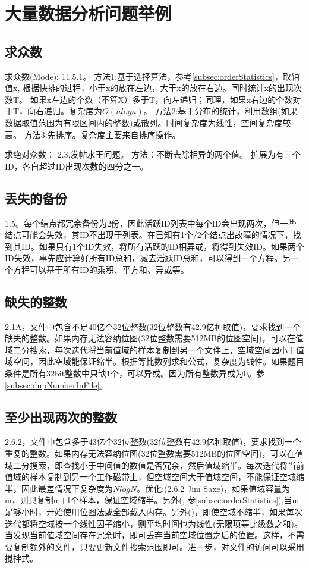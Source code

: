 
\section{大量数据分析问题举例}


\subsection{求众数}
求众数(Mode):
\cite{pp}11.5.1。
方法1:基于选择算法，参考\ref{subsec:orderStatistics}，取轴值x, 根据快排的过程，小于x的放在左边，大于x的放在右边。同时统计x的出现次数T。 如果x左边的个数（不算X）多于T，向左递归；同理，如果x右边的个数对于T，向右递归。复杂度为$O(nlogn)$。
方法2:基于分布的统计，利用数组(如果数据取值范围为有限区间内的整数)或散列。时间复杂度为线性，空间复杂度较高。
方法3:先排序。复杂度主要来自排序操作。

求绝对众数：
\cite{bop}2.3,发帖水王问题。
方法：不断去除相异的两个值。
扩展为有三个ID，各自超过ID出现次数的四分之一。



\subsection{丢失的备份}
\cite{bop}1.5。每个结点都冗余备份为2份，因此活跃ID列表中每个ID会出现两次，但一些结点可能会失效，其ID不出现于列表。在已知有1个/2个结点出故障的情况下，找到其ID。如果只有1个ID失效，将所有活跃的ID相异或，将得到失效ID。如果两个ID失效，事先应计算好所有ID总和，减去活跃ID总和，可以得到一个方程。另一个方程可以基于所有ID的乘积、平方和、异或等。

\subsection{缺失的整数}
\cite{pp}2.1A，文件中包含不足40亿个32位整数(32位整数有42.9亿种取值)，要求找到一个缺失的整数。如果内存无法容纳位图(32位整数需要512MB的位图空间)，可以在值域二分搜索，每次迭代将当前值域的样本复制到另一个文件上，空域空间因小于值域空间，因此空域能保证缩半。根据等比数列求和公式，复杂度为线性。如果题目条件是所有32bit整数中只缺1个，可以异或。因为所有整数异或为0。参\ref{subsec:dupNumberInFile}。

\subsection{至少出现两次的整数}
\cite{pp}2.6.2，文件中包含多于43亿个32位整数(32位整数有42.9亿种取值)，要求找到一个重复的整数。如果内存无法容纳位图(32位整数需要512MB的位图空间)，可以在值域二分搜索，即查找小于中间值的数值是否冗余，然后值域缩半。每次迭代将当前值域的样本复制到另一个工作磁带上，但空域空间大于值域空间，不能保证空域缩半，因此最差情况下复杂度为$NlogN$。优化:(\cite{pp}2.6.2 Jim Saxe)，如果值域容量为m，则只复制m+1个样本，保证空域缩半。另外(\cite{self}, 参\ref{subsec:orderStatistics}),当m足够小时，开始使用位图法或全部载入内存。另外(\cite{self})，即使空域不缩半，如果每次迭代都将空域按一个线性因子缩小，则平均时间也为线性(无限项等比级数之和)。当发现当前值域空间存在冗余时，即可丢弃当前空域位置之后的位置。这样，不需要复制额外的文件，只要更新文件搜索范围即可。进一步，对文件的访问可以采用搅拌式。

\label{subsec:dupNumberInFile}
